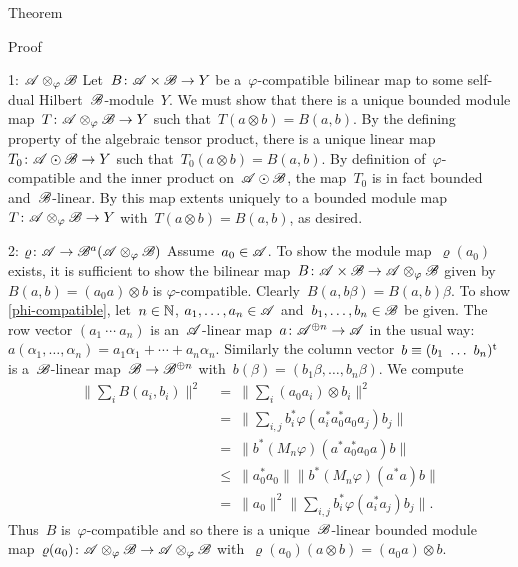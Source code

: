 \documentclass[b]{subfiles}
\begin{document}
\begin{parsec}
\begin{point}{Theorem}
\begin{point}{Proof}
\begin{point}{1: $\mathscr{A} \otimes_\varphi \mathscr{B}$}
Let~$B \colon \mathscr{A} \times \mathscr{B} \to Y$
    be a~$\varphi$-compatible
    bilinear map to some self-dual Hilbert~$\mathscr{B}$-module~$Y$.
We must show that there is a unique bounded module
    map~$T \colon \mathscr{A} \otimes_\varphi \mathscr{B} \to Y$
    such that~$T(a\otimes b) = B(a,b)$.
By the defining property of the algebraic
    tensor product, there is a unique linear
    map~$T_0\colon \mathscr{A} \odot \mathscr{B} \to Y$
    such that~$T_0(a\otimes b) = B(a,b)$.
By definition of~$\varphi$-compatible
    and the inner product on~$\mathscr{A}\odot \mathscr{B}$,
    the map~$T_0$ is in fact bounded and~$\mathscr{B}$-linear.
By 
    this map extents uniquely
    to a bounded module map~$T \colon \mathscr{A} \otimes_\varphi \mathscr{B} \to Y$
    with~$T(a\otimes b) = B(a,b)$, as desired.
\end{point}
\begin{point}{2: $\varrho \colon \mathscr{A} \to \mathscr{B}^a(\mathscr{A} \otimes_\varphi \mathscr{B})$}%
Assume~$a_0 \in \mathscr{A}$.
To show the module map~$\varrho(a_0)$ exists,
    it is sufficient to show the bilinear
    map~$B\colon \mathscr{A} \times \mathscr{B} \to \mathscr{A} \otimes_\varphi \mathscr{B}$
    given by~$B(a,b) = (a_0a)\otimes b$ is $\varphi$-compatible.
Clearly~$B(a,b \beta) = B(a,b)\beta$.
To show \eqref{phi-compatible},
    let~$n \in \mathbb{N}$, $a_1, \ldots, a_n \in \mathscr{A}$
    and~$b_1, \ldots, b_n \in \mathscr{B}$
    be given.
The row vector
    $(a_1\ \cdots \ a_n)$
    is an~$\mathscr{A}$-linear map~$a\colon \mathscr{A}^{\oplus n} \to \mathscr{A}$
    in the usual way:~$a(\alpha_1, \ldots, \alpha_n) = a_1\alpha_1 + \cdots + a_n \alpha_n$.
    Similarly the column vector~$b \equiv (b_1\  \ldots\ b_n)^{\mathrm{t}}$
    is a~$\mathscr{B}$-linear map~$\mathscr{B} \to \mathscr{B}^{\oplus n}$
    with~$b(\beta) = (b_1 \beta, \ldots, b_n \beta)$.
    We compute
\begin{align*}
    \bigl\| \sum_i B(a_i,b_i) \bigr\|^2
    & \ =\  \bigl\| \sum_i (a_0 a_i) \otimes b_i \bigr\|^2 \\
    & \ =\  \bigl\| \sum_{i,j} b_i^* \varphi(a_i^* a_0^* a_0 a_j)b_j\bigr\| \\
    & \ =\   \| b^* (M_n \varphi) (a^*a_0^*a_0a) b\| \\
    &\  \leq\  \|a_0^*a_0\| \|b^* (M_n \varphi) (a^*a) b\| \\
    & \ =\  \|a_0\|^2  \bigl\| \sum_{i,j} b_i^* \varphi(a_i^*a_j)b_j\bigr\|.
\end{align*}
Thus~$B$ is~$\varphi$-compatible
    and so there is a unique~$\mathscr{B}$-linear bounded module
    map~$\varrho(a_0)\colon \mathscr{A} \otimes_\varphi \mathscr{B}
            \to \mathscr{A} \otimes_\varphi \mathscr{B}$
            with~$\varrho(a_0) (a\otimes b) = (a_0 a) \otimes b$.

\end{point}
\end{point}
\end{point}
\end{parsec}
\end{document}
